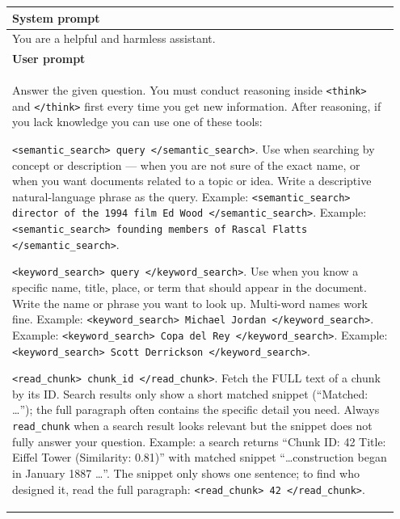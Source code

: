 \documentclass[11pt]{article}
\begin{document}
\begin{table}[t]
\centering
\small
\begin{tabular}{p{0.95\linewidth}}
\hline
\textbf{System prompt} \\
\hline
You are a helpful and harmless assistant. \\
\hline
\textbf{User prompt} \\
\hline
Answer the given question. You must conduct reasoning inside \texttt{\textless{}think\textgreater{}} and \texttt{\textless{}/think\textgreater{}} first every time you get new information. After reasoning, if you lack knowledge you can use one of these tools:

\quad \texttt{\textless{}semantic\_search\textgreater{} query \textless{}/semantic\_search\textgreater{}}.
Use when searching by concept or description --- when you are not sure of the exact name, or when you want documents related to a topic or idea. Write a descriptive natural-language phrase as the query.
Example: \texttt{\textless{}semantic\_search\textgreater{} director of the 1994 film Ed Wood \textless{}/semantic\_search\textgreater{}}.
Example: \texttt{\textless{}semantic\_search\textgreater{} founding members of Rascal Flatts \textless{}/semantic\_search\textgreater{}}.

\quad \texttt{\textless{}keyword\_search\textgreater{} query \textless{}/keyword\_search\textgreater{}}.
Use when you know a specific name, title, place, or term that should appear in the document. Write the name or phrase you want to look up. Multi-word names work fine.
Example: \texttt{\textless{}keyword\_search\textgreater{} Michael Jordan \textless{}/keyword\_search\textgreater{}}.
Example: \texttt{\textless{}keyword\_search\textgreater{} Copa del Rey \textless{}/keyword\_search\textgreater{}}.
Example: \texttt{\textless{}keyword\_search\textgreater{} Scott Derrickson \textless{}/keyword\_search\textgreater{}}.

\quad \texttt{\textless{}read\_chunk\textgreater{} chunk\_id \textless{}/read\_chunk\textgreater{}}.
Fetch the FULL text of a chunk by its ID. Search results only show a short matched snippet (``Matched: \ldots''); the full paragraph often contains the specific detail you need. Always \texttt{read\_chunk} when a search result looks relevant but the snippet does not fully answer your question.
Example: a search returns ``Chunk ID: 42 \textbar{} Title: Eiffel Tower (Similarity: 0.81)'' with matched snippet ``\ldots construction began in January 1887 \ldots''. The snippet only shows one sentence; to find who designed it, read the full paragraph: \texttt{\textless{}read\_chunk\textgreater{} 42 \textless{}/read\_chunk\textgreater{}}.


\end{tabular}
\end{table}
\end{document}
